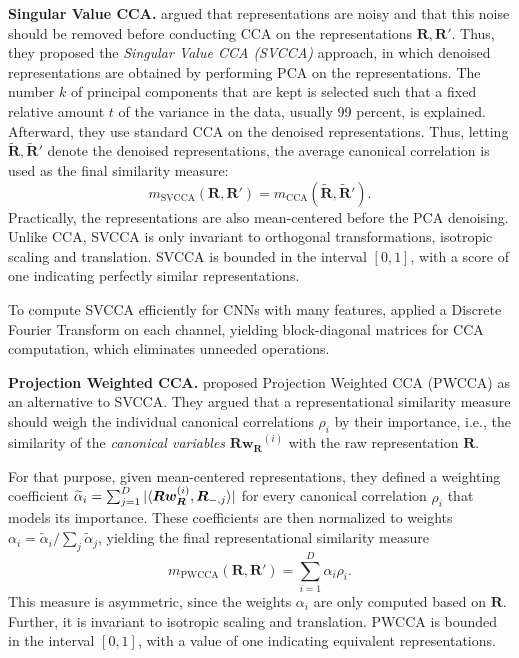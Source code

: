 \documentclass{article}
\newcommand{\citet}{\textcite}
\newcommand{\R}{\bm{R}}
\newcommand{\Rp}{\bm{R'}}
\newcommand{\subheader}{\textbf}
\begin{document}
\subheader{Singular Value CCA.}
\citet{raghu_svcca_2017} argued that representations are noisy and that this noise should be removed before conducting CCA on the representations $\R,\Rp$.
Thus, they proposed the \emph{Singular Value CCA (SVCCA)} approach, in which denoised representations are obtained by performing PCA on the representations.
The number $k$ of principal components that are kept is selected such that a fixed relative amount $t$ of the variance in the data, usually 99 percent, is explained.
Afterward, they use standard CCA on the denoised representations.
Thus, letting $\widetilde{\bm{\R}},\widetilde{\R}'$ denote the denoised representations, the average canonical correlation is used as the final similarity measure:
\begin{equation}\label{eq:svcca}
    m_{\operatorname{SVCCA}}(\R, \Rp) = m_{\operatorname{CCA}}(\widetilde{\bm{\R}},\widetilde{\R}').
\end{equation}
Practically, the representations are also mean-centered before the PCA denoising.
Unlike CCA, SVCCA is only invariant to orthogonal transformations, isotropic scaling and translation.
SVCCA is bounded in the interval $[0,1]$, with a score of one indicating perfectly similar representations.

To compute SVCCA efficiently for CNNs with many features, \citet{raghu_svcca_2017} applied a Discrete Fourier Transform on each channel, yielding block-diagonal matrices for CCA computation, which eliminates unneeded operations.



\subheader{Projection Weighted CCA.}\label{sssec:pwcca}
\citet{morcos_insights_2018} proposed Projection Weighted CCA (PWCCA) as an alternative to SVCCA.
They argued that a representational similarity measure should weigh the individual canonical correlations $\rho_i$ by their importance, i.e., the similarity of the \emph{canonical variables} $\bm{Rw_{\R}}^{(i)}$ with the raw representation $\R$.

For that purpose, given mean-centered representations, they defined a weighting coefficient
$\widetilde{\alpha}_i = \textstyle\sum_{j=1}^D |\langle \bm{Rw_{\R}}^{(i)}, \R_{\--,j} \rangle |
$
for every canonical correlation $\rho_i$ that models its importance.
These coefficients are then normalized to weights $\alpha_i = \widetilde{\alpha}_i / \textstyle\sum_j \widetilde{\alpha}_j$, yielding the final representational similarity measure
\begin{equation}\label{eq:pwcca}
    m_{\operatorname{PWCCA}}(\R,\Rp) = \textstyle\sum_{i=1}^{D} \alpha_i \rho_i.
\end{equation}
This measure is asymmetric, since the weights $\alpha_i$ are only computed based on $\R$. Further, it is invariant to isotropic scaling and translation.
PWCCA is bounded in the interval $[0,1]$, with a value of one indicating equivalent representations.
\end{document}
